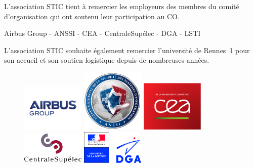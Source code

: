 \noindent
L'association STIC tient à remercier les employeurs des membres du
comité d'organisation qui ont soutenu leur participation au CO.

\begin{center}
Airbus Group - ANSSI -  CEA - CentraleSup\'elec - DGA - LSTI
\end{center}

\bigskip

\noindent
L'association STIC souhaite également remercier l'université de
Rennes~1 pour son accueil et son soutien logistique depuis de
nombreuses années.


\begin{figure}[h]
\begin{center}
\parbox{3cm}{\includegraphics[width=3cm]{_frontmatter/logos/airbus}}
\hfill
\parbox{3cm}{\includegraphics[width=3cm]{_frontmatter/logos/anssi}}
\hfill
\parbox{3cm}{\includegraphics[width=3cm]{_frontmatter/logos/cea}}
\end{center}
\vfill
\begin{center}
\parbox{3cm}{\includegraphics[width=3cm]{_frontmatter/logos/centrale-supelec}}
\hfill
\parbox{3cm}{\includegraphics[width=3cm]{_frontmatter/logos/dga}}

\end{center}
\end{figure}
